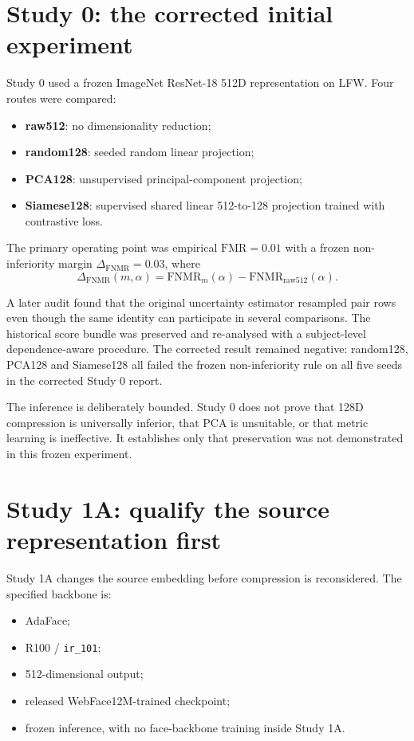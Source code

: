 \documentclass[10pt,a4paper]{article}
\newcommand{\fnmr}{\mathrm{FNMR}}
\newcommand{\fmr}{\mathrm{FMR}}
\newcommand{\DeltaFNMR}{\Delta_{\fnmr}}
\newcommand{\code}[1]{\texttt{#1}}
\begin{document}
\section{Study 0: the corrected initial experiment}

Study 0 used a frozen ImageNet ResNet-18 512D representation on LFW. Four routes were compared:

\begin{itemize}
\item \textbf{raw512}: no dimensionality reduction;
\item \textbf{random128}: seeded random linear projection;
\item \textbf{PCA128}: unsupervised principal-component projection;
\item \textbf{Siamese128}: supervised shared linear 512-to-128 projection trained with contrastive loss.
\end{itemize}

The primary operating point was empirical $\fmr=0.01$ with a frozen non-inferiority margin
$\DeltaFNMR=0.03$, where
\[
\DeltaFNMR(m,\alpha)=\fnmr_m(\alpha)-\fnmr_{\mathrm{raw512}}(\alpha).
\]

A later audit found that the original uncertainty estimator resampled pair rows even though the same identity
can participate in several comparisons. The historical score bundle was preserved and re-analysed with a
subject-level dependence-aware procedure. The corrected result remained negative: random128, PCA128 and
Siamese128 all failed the frozen non-inferiority rule on all five seeds in the corrected Study 0 report.

The inference is deliberately bounded. Study 0 does not prove that 128D compression is universally inferior,
that PCA is unsuitable, or that metric learning is ineffective. It establishes only that preservation was not
demonstrated in this frozen experiment.

\section{Study 1A: qualify the source representation first}

Study 1A changes the source embedding before compression is reconsidered. The specified backbone is:

\begin{itemize}
\item AdaFace;
\item R100 / \code{ir\_101};
\item 512-dimensional output;
\item released WebFace12M-trained checkpoint;
\item frozen inference, with no face-backbone training inside Study 1A.
\end{itemize}
\end{document}
